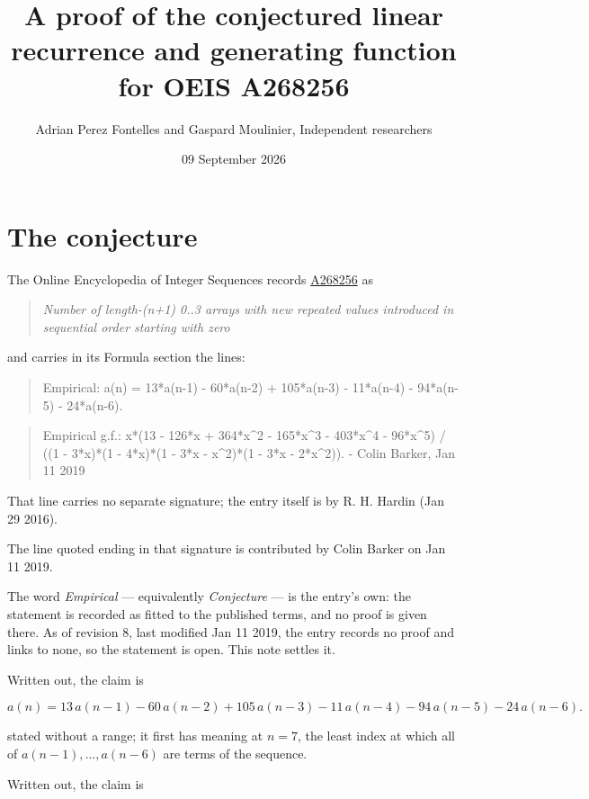 \documentclass[11pt]{article}
\title{A proof of the conjectured linear recurrence and generating function for OEIS A268256}
\author{Adrian Perez Fontelles and Gaspard Moulinier, Independent researchers}
\date{09 September 2026}
\theoremstyle{definition}
\begin{document}
\maketitle
\section{The conjecture}

The Online Encyclopedia of Integer Sequences records \href{https://oeis.org/A268256}{A268256} as

\begin{quote}\itshape Number of length-(n+1) 0..3 arrays with new repeated values introduced in sequential order starting with zero\end{quote}

and carries in its Formula section the lines:

\begin{quote}\ttfamily Empirical: a(n) = 13*a(n-1) - 60*a(n-2) + 105*a(n-3) - 11*a(n-4) - 94*a(n-5) - 24*a(n-6).\end{quote}

\begin{quote}\ttfamily Empirical g.f.: x*(13 - 126*x + 364*x\textasciicircum{}2 - 165*x\textasciicircum{}3 - 403*x\textasciicircum{}4 - 96*x\textasciicircum{}5) / ((1 - 3*x)*(1 - 4*x)*(1 - 3*x - x\textasciicircum{}2)*(1 - 3*x - 2*x\textasciicircum{}2)). - Colin Barker, Jan 11 2019\end{quote}

That line carries no separate signature; the entry itself is by R. H. Hardin (Jan 29 2016).

The line quoted ending in that signature is contributed by Colin Barker on Jan 11 2019.

The word {\itshape Empirical} --- equivalently {\itshape Conjecture} --- is the entry's own: the statement is recorded as fitted to the published terms, and no proof is given there. As of revision 8, last modified Jan 11 2019, the entry records no proof and links to none, so the statement is open. This note settles it.

Written out, the claim is

\[a(n) = 13\,a(n-1) - 60\,a(n-2) + 105\,a(n-3) - 11\,a(n-4) - 94\,a(n-5) - 24\,a(n-6).\]

stated without a range; it first has meaning at $n = 7$, the least index at which all of $a(n-1),\dots,a(n-6)$ are terms of the sequence.

Written out, the claim is
\end{document}
